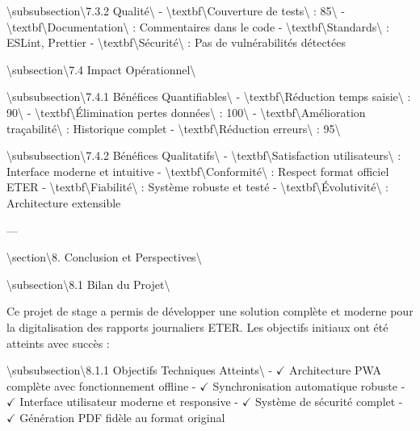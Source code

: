 \documentclass[12pt,a4paper]{report}
\begin{document}
\textbackslash{}subsubsection\textbackslash{}{7.3.2 Qualité\textbackslash{}}
- \textbackslash{}textbf\textbackslash{}{Couverture de tests\textbackslash{}} : 85\textbackslash{}%
- \textbackslash{}textbf\textbackslash{}{Documentation\textbackslash{}} : Commentaires dans le code
- \textbackslash{}textbf\textbackslash{}{Standards\textbackslash{}} : ESLint, Prettier
- \textbackslash{}textbf\textbackslash{}{Sécurité\textbackslash{}} : Pas de vulnérabilités détectées

\textbackslash{}subsection\textbackslash{}{7.4 Impact Opérationnel\textbackslash{}}

\textbackslash{}subsubsection\textbackslash{}{7.4.1 Bénéfices Quantifiables\textbackslash{}}
- \textbackslash{}textbf\textbackslash{}{Réduction temps saisie\textbackslash{}} : 90\textbackslash{}%
- \textbackslash{}textbf\textbackslash{}{Élimination pertes données\textbackslash{}} : 100\textbackslash{}%
- \textbackslash{}textbf\textbackslash{}{Amélioration traçabilité\textbackslash{}} : Historique complet
- \textbackslash{}textbf\textbackslash{}{Réduction erreurs\textbackslash{}} : 95\textbackslash{}%

\textbackslash{}subsubsection\textbackslash{}{7.4.2 Bénéfices Qualitatifs\textbackslash{}}
- \textbackslash{}textbf\textbackslash{}{Satisfaction utilisateurs\textbackslash{}} : Interface moderne et intuitive
- \textbackslash{}textbf\textbackslash{}{Conformité\textbackslash{}} : Respect format officiel ETER
- \textbackslash{}textbf\textbackslash{}{Fiabilité\textbackslash{}} : Système robuste et testé
- \textbackslash{}textbf\textbackslash{}{Évolutivité\textbackslash{}} : Architecture extensible

---

\textbackslash{}section\textbackslash{}{8. Conclusion et Perspectives\textbackslash{}}

\textbackslash{}subsection\textbackslash{}{8.1 Bilan du Projet\textbackslash{}}

Ce projet de stage a permis de développer une solution complète et moderne pour la digitalisation des rapports journaliers ETER. Les objectifs initiaux ont été atteints avec succès :

\textbackslash{}subsubsection\textbackslash{}{8.1.1 Objectifs Techniques Atteints\textbackslash{}}
- $\checkmark$ Architecture PWA complète avec fonctionnement offline
- $\checkmark$ Synchronisation automatique robuste
- $\checkmark$ Interface utilisateur moderne et responsive
- $\checkmark$ Système de sécurité complet
- $\checkmark$ Génération PDF fidèle au format original
\end{document}
